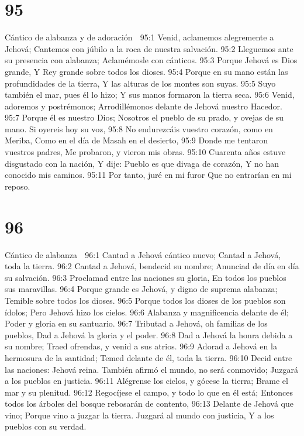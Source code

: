 \chapter{95}

Cántico de alabanza y de adoración 

95:1 Venid, aclamemos alegremente a Jehová; 
Cantemos con júbilo a la roca de nuestra salvación. 
95:2 Lleguemos ante su presencia con alabanza; 
Aclamémosle con cánticos. 
95:3 Porque Jehová es Dios grande, 
Y Rey grande sobre todos los dioses. 
95:4 Porque en su mano están las profundidades de la tierra, 
Y las alturas de los montes son suyas. 
95:5 Suyo también el mar, pues él lo hizo; 
Y sus manos formaron la tierra seca. 
95:6 Venid, adoremos y postrémonos; 
Arrodillémonos delante de Jehová nuestro Hacedor. 
95:7 Porque él es nuestro Dios; 
Nosotros el pueblo de su prado, y ovejas de su mano. 
Si oyereis hoy su voz, 
95:8 No endurezcáis vuestro corazón, como en Meriba, 
Como en el día de Masah en el desierto, 
95:9 Donde me tentaron vuestros padres, 
Me probaron,  y vieron mis obras. 
95:10 Cuarenta años estuve disgustado con la nación, 
Y dije: Pueblo es que divaga de corazón, 
Y no han conocido mis caminos. 
95:11 Por tanto, juré en mi furor 
Que no entrarían en mi reposo. 

\chapter{96}

Cántico de alabanza 
 
96:1 Cantad a Jehová cántico nuevo; 
Cantad a Jehová, toda la tierra. 
96:2 Cantad a Jehová, bendecid su nombre; 
Anunciad de día en día su salvación. 
96:3 Proclamad entre las naciones su gloria, 
En todos los pueblos sus maravillas. 
96:4 Porque grande es Jehová, y digno de suprema alabanza; 
Temible sobre todos los dioses. 
96:5 Porque todos los dioses de los pueblos son ídolos; 
Pero Jehová hizo los cielos. 
96:6 Alabanza y magnificencia delante de él; 
Poder y gloria en su santuario. 
96:7 Tributad a Jehová, oh familias de los pueblos, 
Dad a Jehová la gloria y el poder. 
96:8 Dad a Jehová la honra debida a su nombre; 
Traed ofrendas, y venid a sus atrios. 
96:9 Adorad a Jehová en la hermosura de la santidad;  
Temed delante de él, toda la tierra. 
96:10 Decid entre las naciones: Jehová reina. 
También afirmó el mundo, no será conmovido; 
Juzgará a los pueblos en justicia. 
96:11 Alégrense los cielos, y gócese la tierra; 
Brame el mar y su plenitud. 
96:12 Regocíjese el campo, y todo lo que en él está; 
Entonces todos los árboles del bosque rebosarán de contento, 
96:13 Delante de Jehová que vino; 
Porque vino a juzgar la tierra. 
Juzgará al mundo con justicia, 
Y a los pueblos con su verdad. 

